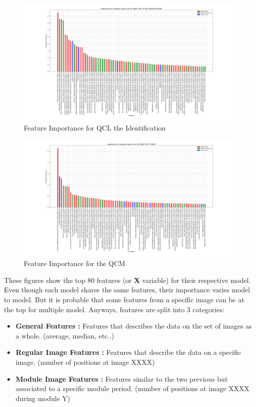 \documentclass[a4paper,11pt]{report}
\numberwithin{figure}{section} %
\begin{document}
      \begin{figure}[H]
      \centering
      \includegraphics[width=.95\linewidth]{plots/var_importance_TRIAL_TEST_TP_QCL_IDENTIFICATION_2018-04-29_14_28_02.png}
      \caption{Feature Importance for QCL the Identification}
      \label{fig:var_white2}
      \end{figure}

      \begin{figure}[H]
      \centering
      \includegraphics[width=.95\linewidth]{plots/var_importance_TRIAL_TEST_TP_QCM_2018-04-29_14_34_16.png}
      \caption{Feature Importance for the QCM}
      \label{fig:var_white3}
      \end{figure}

    These figures show the top 80 features (or \textbf{X} variable) for their respective model.
    Even though each model shares the same features, their importance varies model to model.
    But it is probable that some features from a specific image can be at the top for multiple model.
    Anyways, features are split into 3 categories:
    \begin{itemize}
    \item[\textbullet] \textbf{General Features :} Features that describes the data on the set of images as a whole. (average, median, etc..)
    \item[\textbullet] \textbf{Regular Image Features :} Features that describe the data on a specific image. (number of positions at image XXXX)
    \item[\textbullet] \textbf{Module Image Features :} Features similar to the two previous but associated to a specific module period. (number of positions at image XXXX during module Y)
    \end{itemize}
\end{document}
